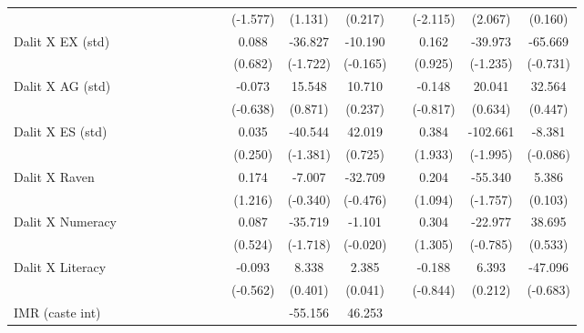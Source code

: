 {\begin{longtable}{@{\extracolsep{\fill}}lccccccccccccccc}
          &       &       &       &       &       &       &       &       & (-1.577) & (1.131) & (0.217) &       & (-2.115) & (2.067) & (0.160) \\
    Dalit X EX (std) &       &       &       &       &       &       &       &       & 0.088 & -36.827 & -10.190 &       & 0.162 & -39.973 & -65.669 \\
          &       &       &       &       &       &       &       &       & (0.682) & (-1.722) & (-0.165) &       & (0.925) & (-1.235) & (-0.731) \\
    Dalit X AG (std) &       &       &       &       &       &       &       &       & -0.073 & 15.548 & 10.710 &       & -0.148 & 20.041 & 32.564 \\
          &       &       &       &       &       &       &       &       & (-0.638) & (0.871) & (0.237) &       & (-0.817) & (0.634) & (0.447) \\
    Dalit X ES (std) &       &       &       &       &       &       &       &       & 0.035 & -40.544 & 42.019 &       & 0.384 & -102.661 & -8.381 \\
          &       &       &       &       &       &       &       &       & (0.250) & (-1.381) & (0.725) &       & (1.933) & (-1.995) & (-0.086) \\
    Dalit X Raven &       &       &       &       &       &       &       &       & 0.174 & -7.007 & -32.709 &       & 0.204 & -55.340 & 5.386 \\
          &       &       &       &       &       &       &       &       & (1.216) & (-0.340) & (-0.476) &       & (1.094) & (-1.757) & (0.103) \\
    Dalit X Numeracy &       &       &       &       &       &       &       &       & 0.087 & -35.719 & -1.101 &       & 0.304 & -22.977 & 38.695 \\
          &       &       &       &       &       &       &       &       & (0.524) & (-1.718) & (-0.020) &       & (1.305) & (-0.785) & (0.533) \\
    Dalit X Literacy &       &       &       &       &       &       &       &       & -0.093 & 8.338 & 2.385 &       & -0.188 & 6.393 & -47.096 \\
          &       &       &       &       &       &       &       &       & (-0.562) & (0.401) & (0.041) &       & (-0.844) & (0.212) & (-0.683) \\
    IMR (caste int) &       &       &       &       &       &       &       &       &       & -55.156 & 46.253 &       &       &       &  \\

\end{longtable}}

